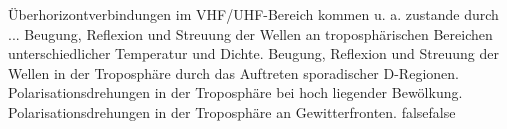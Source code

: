     {Überhorizontverbindungen im VHF/UHF-Bereich kommen u. a. zustande durch ...}
    {Beugung, Reflexion und Streuung der Wellen an troposphärischen Bereichen unterschiedlicher Temperatur und Dichte.}
    {Beugung, Reflexion und Streuung der Wellen in der Troposphäre durch das Auftreten sporadischer D-Regionen.}
    {Polarisationsdrehungen in der Troposphäre bei hoch liegender Bewölkung.}
    {Polarisationsdrehungen in der Troposphäre an Gewitterfronten.}
    {false}{false}